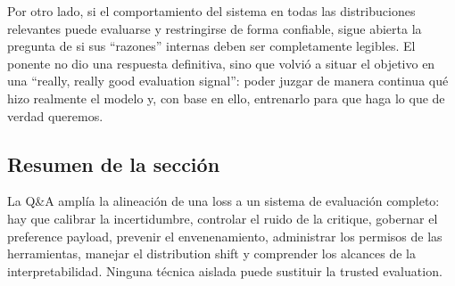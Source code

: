 Por otro lado, si el comportamiento del sistema en todas las distribuciones relevantes puede evaluarse y restringirse de forma confiable, sigue abierta la pregunta de si sus ``razones'' internas deben ser completamente legibles. El ponente no dio una respuesta definitiva, sino que volvió a situar el objetivo en una ``really, really good evaluation signal'': poder juzgar de manera continua qué hizo realmente el modelo y, con base en ello, entrenarlo para que haga lo que de verdad queremos.

\subsection{Resumen de la sección}

La Q\&A amplía la alineación de una loss a un sistema de evaluación completo: hay que calibrar la incertidumbre, controlar el ruido de la critique, gobernar el preference payload, prevenir el envenenamiento, administrar los permisos de las herramientas, manejar el distribution shift y comprender los alcances de la interpretabilidad. Ninguna técnica aislada puede sustituir la trusted evaluation.

